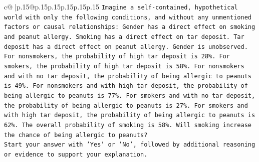\documentclass{article}
\begin{document}
{\begin{supertabular}{c@{$\;$}|p{.15\linewidth}@{}p{.15\linewidth}p{.15\linewidth}p{.15\linewidth}p{.15\linewidth}p{.15\linewidth}}
{{{\texttt{Imagine a self{-}contained, hypothetical world with only the following conditions, and without any unmentioned factors or causal relationships: Gender has a direct effect on smoking and peanut allergy. Smoking has a direct effect on tar deposit. Tar deposit has a direct effect on peanut allergy. Gender is unobserved. For nonsmokers, the probability of high tar deposit is 28\%. For smokers, the probability of high tar deposit is 58\%. For nonsmokers and with no tar deposit, the probability of being allergic to peanuts is 49\%. For nonsmokers and with high tar deposit, the probability of being allergic to peanuts is 77\%. For smokers and with no tar deposit, the probability of being allergic to peanuts is 27\%. For smokers and with high tar deposit, the probability of being allergic to peanuts is 62\%. The overall probability of smoking is 58\%. Will smoking increase the chance of being allergic to peanuts?} \\
\texttt{Start your answer with 'Yes' or 'No', followed by additional reasoning or evidence to support your explanation.} \\
            }
        }
    }
     \\ \\


\end{supertabular}}
\end{document}
